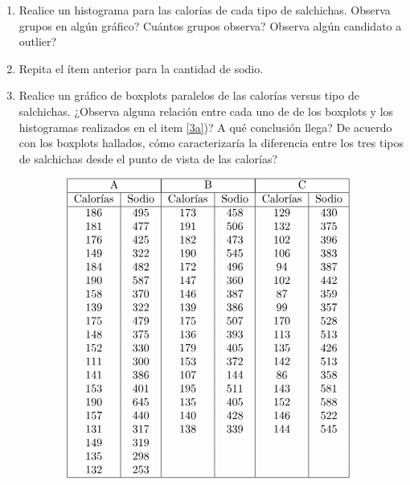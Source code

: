 \documentclass[a4paper, 11pt]{article}
\begin{document}
\begin{enumerate}
\begin{enumerate}
\item \label{3a} Realice un histograma para las calorías de cada tipo de salchichas.
\textquestiondown Observa grupos en algún gráfico?
\textquestiondown Cuántos grupos observa? \textquestiondown Observa
algún candidato a outlier?


\item Repita el ítem anterior para la cantidad de sodio.


\item Realice un gráfico de boxplots paralelos de las calorías versus tipo de salchichas.
¿Observa alguna relación entre cada uno de de los boxplots y los histogramas realizados en el item \ref{3a})? A qué conclusión llega? De acuerdo con los boxplots
hallados, \textquestiondown cómo caracterizaría la diferencia entre los tres tipos de salchichas desde el punto de vista de las calorías?%

\[%
\begin{tabular}
[c]{|c|c|c|c|c|c|}\hline
\multicolumn{2}{|c|}{A} & \multicolumn{2}{|c|}{B} & \multicolumn{2}{|c|}{C}%
\\\hline
Calorías & Sodio & Calorías & Sodio & Calorías & Sodio\\\hline
186 & 495 & 173 & 458 & 129 & 430\\
181 & 477 & 191 & 506 & 132 & 375\\
176 & 425 & 182 & 473 & 102 & 396\\
149 & 322 & 190 & 545 & 106 & 383\\
184 & 482 & 172 & 496 & 94 & 387\\
190 & 587 & 147 & 360 & 102 & 442\\
158 & 370 & 146 & 387 & 87 & 359\\
139 & 322 & 139 & 386 & 99 & 357\\
175 & 479 & 175 & 507 & 170 & 528\\
148 & 375 & 136 & 393 & 113 & 513\\
152 & 330 & 179 & 405 & 135 & 426\\
111 & 300 & 153 & 372 & 142 & 513\\
141 & 386 & 107 & 144 & 86 & 358\\
153 & 401 & 195 & 511 & 143 & 581\\
190 & 645 & 135 & 405 & 152 & 588\\
157 & 440 & 140 & 428 & 146 & 522\\
131 & 317 & 138 & 339 & 144 & 545\\
149 & 319 &  &  &  & \\
135 & 298 &  &  &  & \\
132 & 253 &  &  &  & \\\hline
\end{tabular}
\ \
\]



\end{enumerate}
\end{enumerate}
\end{document}
